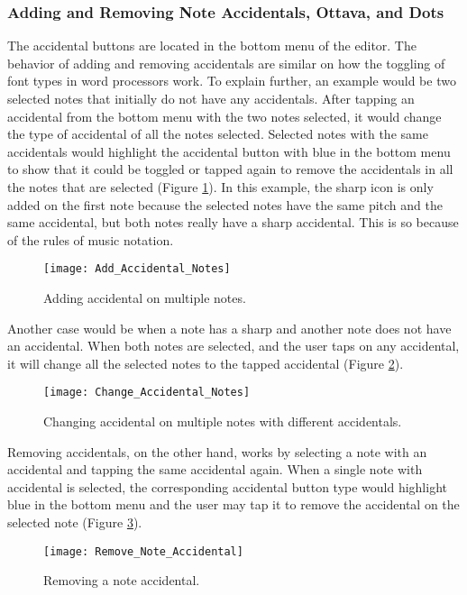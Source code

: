 \subsubsection{Adding and Removing Note Accidentals, Ottava, and Dots}
The accidental buttons are located in the bottom menu of the editor. The behavior of adding and removing accidentals are similar on how the toggling of font types in word processors work. To explain further, an example would be two selected notes that initially do not have any accidentals. After tapping an accidental from the bottom menu with the two notes selected, it would change the type of accidental of all the notes selected. Selected notes with the same accidentals would highlight the accidental button with blue in the bottom menu to show that it could be toggled or tapped again to remove the accidentals in all the notes that are selected (Figure \ref{fig:add-accidental-notes}). In this example, the sharp icon is only added on the first note because the selected notes have the same pitch and the same accidental, but both notes really have a sharp accidental. This is so because of the rules of music notation.

\begin{figure}[H]
	\centering
	\texttt{[image: Add\_Accidental\_Notes]}
    \caption{Adding accidental on multiple notes.}
    \label{fig:add-accidental-notes}
\end{figure}

Another case would be when a note has a sharp and another note does not have an accidental. When both notes are selected, and the user taps on any accidental, it will change all the selected notes to the tapped accidental (Figure \ref{fig:change-accidental-notes}).

\begin{figure}[H]
	\centering
	\texttt{[image: Change\_Accidental\_Notes]}
    \caption{Changing accidental on multiple notes with different accidentals.}
    \label{fig:change-accidental-notes}
\end{figure}

Removing accidentals, on the other hand, works by selecting a note with an accidental and tapping the same accidental again. When a single note with accidental is selected, the corresponding accidental button type would highlight blue in the bottom menu and the user may tap it to remove the accidental on the selected note (Figure \ref{fig:remove-note-accidental}).

\begin{figure}[H]
	\centering
	\texttt{[image: Remove\_Note\_Accidental]}
    \caption{Removing a note accidental.}
    \label{fig:remove-note-accidental}
\end{figure}

